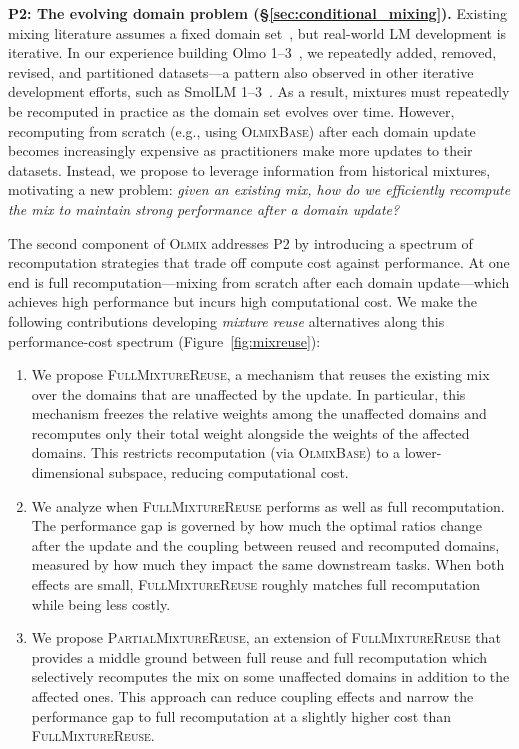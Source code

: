\documentclass[table]{ai2style/ai2}
\newcommand{\olmix}{\textsc{Olmix}\xspace}
\newcommand{\base}[0]{\textsc{OlmixBase}\xspace}
\newcommand{\fullmixreuse}[0]{\textsc{FullMixtureReuse}\xspace}
\newcommand{\partialmixreuse}[0]{\textsc{PartialMixtureReuse}\xspace}
\begin{document}
\textbf{P2: The evolving domain problem (\S\ref{sec:conditional_mixing}).} 
Existing mixing literature assumes a fixed domain set~\citep{albalak2024surveydataselectionlanguage}, but real-world LM development is iterative. 
In our experience building Olmo 1--3~\citep{olmo2025olmo3}, we repeatedly added, removed, revised, and partitioned datasets---a pattern also observed in other iterative development efforts, such as SmolLM 1--3~\citep{bakouch2025smollm3}.
As a result, mixtures must repeatedly be recomputed in practice as the domain set evolves over time. 
However, recomputing from scratch (e.g., using \base) after each domain update becomes increasingly expensive as practitioners make more updates to their datasets. 
Instead, we propose to leverage information from historical mixtures, motivating a new problem: \emph{given an existing mix, how do we efficiently recompute the mix to maintain strong performance after a domain update?} 

The second component of \olmix addresses P2 by introducing a spectrum of recomputation strategies that trade off compute cost against performance. At one end is full recomputation---mixing from scratch after each domain update---which achieves high performance but incurs high computational cost. We make the following contributions developing \textit{mixture reuse} alternatives along this performance-cost spectrum (Figure~\ref{fig:mixreuse}):
\begin{enumerate}[itemsep=0.00pt,topsep=0pt,leftmargin=12pt]
\item We propose \fullmixreuse, a mechanism that reuses the existing mix over the domains that are unaffected by the update. In particular, this mechanism freezes the relative weights among the unaffected domains and recomputes only their total weight alongside the weights of the affected domains. This restricts recomputation (via \base) to a lower-dimensional subspace, reducing computational cost.
\item We analyze when \fullmixreuse performs as well as full recomputation. The performance gap is governed by how much the optimal ratios change after the update and the coupling between reused and recomputed domains, measured by how much they impact the same downstream tasks. 
When both effects are small, \fullmixreuse roughly matches full recomputation while being less costly.
\item We propose \partialmixreuse, an extension of \fullmixreuse that provides a middle ground between full reuse and full recomputation which selectively recomputes the mix on some unaffected domains in addition to the affected ones. This approach can reduce coupling effects and narrow the performance gap to full recomputation at a slightly higher cost than \fullmixreuse.
\end{enumerate}
 
\end{document}
